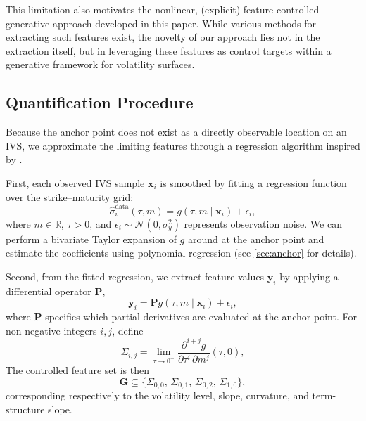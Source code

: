 \documentclass{article}
\begin{document}
This limitation also motivates the nonlinear, (explicit) feature-controlled generative approach developed in this paper. While various methods for extracting such features exist, the novelty of our approach lies not in the extraction itself, but in leveraging these features as control targets within a generative framework for volatility surfaces. 

\subsection{Quantification Procedure} \label{sec:comp_feature}

Because the anchor point does not exist as a directly observable location on an IVS, we approximate the limiting features through a regression algorithm inspired by \citep{ait2021implied}.  


First, each observed IVS sample $\mathbf{x}_i$ is smoothed by fitting a regression function over the strike--maturity grid:
\begin{equation}\label{eq:g}
    \hat{\sigma}^{\text{data}}_i(\tau, m) = g(\tau, m \mid \mathbf{x}_i) + \epsilon_i,
\end{equation}
where $m \in \mathbb{R}$, $\tau > 0$, and $\epsilon_i \sim \mathcal{N}(0, \sigma_y^2)$ represents observation noise. We can perform a bivariate Taylor expansion of $g$ around at the anchor point and estimate the coefficients using polynomial regression (see \autoref{sec:anchor} for details).  

Second, from the fitted regression, we extract feature values $\mathbf{y}_i$ by applying a differential operator $\mathbf{P}$,
\begin{equation} \label{eq:y-regression}
    \mathbf{y}_i = \mathbf{P} g(\tau, m \mid \mathbf{x}_i) + \epsilon_i,
\end{equation}
where $\mathbf{P}$ specifies which partial derivatives are evaluated at the anchor point. For non-negative integers $i,j$, define 
\begin{equation}
    \Sigma_{i,j} = \lim_{\tau \to 0^+} \frac{\partial^{i+j} g}{\partial \tau^i \, \partial m^j}(\tau,0),
\end{equation}
The controlled feature set is then
\begin{equation}
    \mathbf{G} \subseteq \{ \Sigma_{0,0}, \, \Sigma_{0,1}, \, \Sigma_{0,2}, \, \Sigma_{1,0} \},
\end{equation}
corresponding respectively to the volatility level, slope, curvature, and term-structure slope.  
\end{document}
